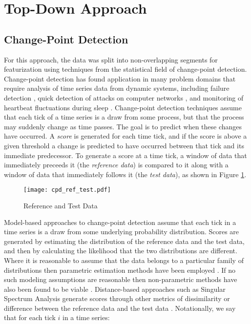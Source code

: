
\section{Top-Down Approach}
\label{sec:topdown}

\subsection{Change-Point Detection}
For this approach, the data was split into non-overlapping segments for
featurization using techniques from the statistical field of change-point detection.
Change-point detection has found application in many problem domains that require analysis of time series data
from dynamic systems, including failure detection \cite{bae13}, quick detection of
attacks on computer networks \cite{tartakovsky06}, and monitoring of heartbeat fluctuations during
sleep \cite{staudacher05}. Change-point detection techniques assume that each tick of a time series is a draw from some
process, but that the process may suddenly change as time passes.
The goal is to predict when these changes have occurred.
A \emph{score} is generated for each time tick, and if the score is
above a given threshold a change is predicted to have occurred between that tick
and its immediate predecessor. To generate a score at
a time tick, a window of data that immediately preceeds it (the
\emph{reference data}) is compared to it along with a window of data that immediately follows it
(the \emph{test data}), as shown in Figure \ref{fig:cpd_ref_test}.

\begin{figure}
 \centering
 \texttt{[image: cpd\_ref\_test.pdf]}
 \caption{Reference and Test Data}
 \label{fig:cpd_ref_test}
\end{figure}

Model-based approaches to change-point detection assume that each tick in
a time series is a draw from some underlying probability distribution.
Scores are generated by estimating the distribution of the reference data
and the test data, and then by calculating the likelihood
that the two distributions are different.
Where it is reasonable to assume that the data belongs to a particular
family of distributions then parametric estimation methods have been employed
\cite{thatte11}. If no such modeling assumptions are reasonable then 
non-parametric methods have also been found to be viable \cite{matteson12}.
Distance-based approaches such as Singular Spectrum Analysis
generate scores through other metrics of 
dissimilarity or difference between the reference data and the test data
\cite{moskvina03}.
Notationally, we say that for each tick $i$ in a time series:

